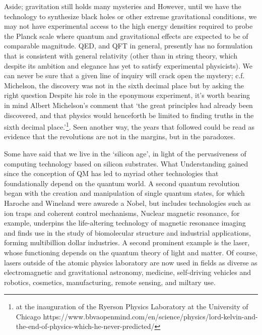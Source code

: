 Aside; gravitation still holds many mysteries and 
	However, until we have the technology to synthesize black holes or other extreme gravitational conditions, we may not have experimental access to the high energy densities required to probe the Planck scale where quantum and gravitational effects are expected to be of comparable magnitude.
	QED, and QFT in general, presently has no formulation that is consistent with general relativity (other than in string theory, which despite its ambition and elegance has yet to satisfy experimental physicists).
	We can never be sure that a given line of inquiry will crack open the mystery; c.f. Michelson, the discovery was not in the sixth decimal place but by asking the right question
	Despite his role in the eponymous experiment, it's worth bearing in mind Albert Michelson's comment that `the great principles had already been discovered, and that physics would henceforth be limited to finding truths in the sixth decimal place.'\footnote{ at the inauguration of the Ryerson Physics Laboratory at the University of Chicago https://www.bbvaopenmind.com/en/science/physics/lord-kelvin-and-the-end-of-physics-which-he-never-predicted/}.
	Seen another way, the years that followed could be read as evidence that the revolutions are not in the margins, but in the paradoxes.

Some have said that we live in the `silicon age', in light of the
	pervasiveness of computing technology based on silicon substrates.
	What	Understanding	gained since the conception of QM has led to myriad other technologies	that foundationally depend on the quantum world.
	A second quantum	revolution began with the creation and manipulation of single quantum	states, for which Haroche and Wineland were awarede a Nobel, but	includes technologies such as ion traps and coherent control mechanisms,
	Nuclear magnetic	resonance, for example, underpins the life-altering technology of	magnetic resonance imaging and finds use in the study of biomolecular	structure and industrial applications, forming multibillion dollar	industries.
	A second prominent example is the laser, whose functioning
	depends on the quantum theory of light and matter.
	Of course, lasers outside of	the atomic physics laboratory are now used in fields as diverse	as electromagnetic and gravitational astronomy, medicine, self-driving	vehicles and robotics, cosmetics, manufacturing, remote sensing, and	miltary use.


